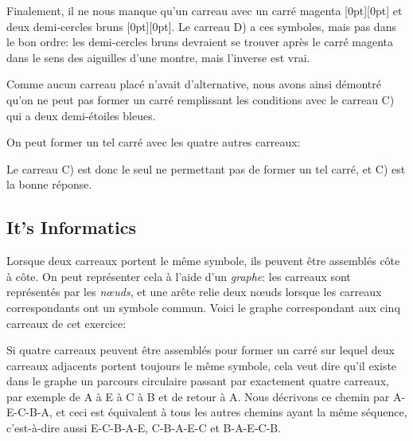 \documentclass[a4paper,11pt]{report}
\newcommand{\taskGraphicsFolder}{..}
\begin{document}
Finalement, il ne nous manque qu’un carreau avec un carré magenta \raisebox{-0.5ex}[0pt][0pt]{} et deux demi-cercles bruns \raisebox{\dimexpr -0.5ex +0.4ex \relax}[0pt][0pt]{}. Le carreau D) a ces symboles, mais pas dans le bon ordre: les demi-cercles bruns devraient se trouver après le carré magenta dans le sens des aiguilles d’une montre, mais l’inverse est vrai.

{\centering%
\par}

Comme aucun carreau placé n’avait d’alternative, nous avons ainsi démontré qu’on ne peut pas former un carré remplissant les conditions avec le carreau C) qui a deux demi-étoiles bleues.

On peut former un tel carré avec les quatre autres carreaux:

{\centering%
\par}

Le carreau C) est donc le seul ne permettant pas de former un tel carré, et C) est la bonne réponse.


\subsection*{It’s Informatics}

Lorsque deux carreaux portent le même symbole, ils peuvent être assemblés côte à côte. On peut représenter cela à l’aide d’un \emph{graphe}: les carreaux sont représentés par les \emph{nœuds}, et une arête relie deux nœuds lorsque les carreaux correspondants ont un symbole commun. Voici le graphe correspondant aux cinq carreaux de cet exercice:

{\centering%
\par}

Si quatre carreaux peuvent être assemblés pour former un carré sur lequel deux carreaux adjacents portent toujours le même symbole, cela veut dire qu’il existe dans le graphe un parcours circulaire passant par exactement quatre carreaux, par exemple de A à E à C à B et de retour à A. Nous décrivons ce chemin par A-E-C-B-A, et ceci est équivalent à tous les autres chemins ayant la même séquence, c’est-à-dire aussi E-C-B-A-E, C-B-A-E-C et B-A-E-C-B.
\end{document}
